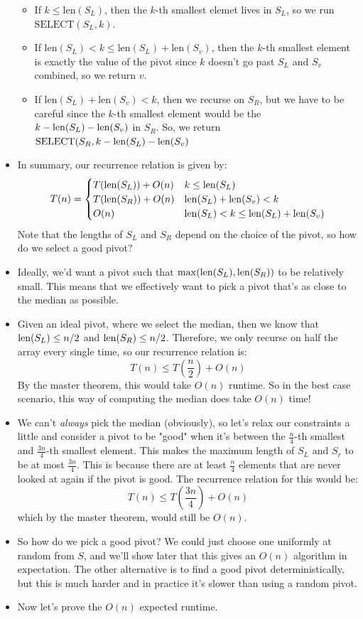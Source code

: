 \begin{itemize}
\begin{itemize}
			\item If \( k \le \text{len}(S_L) \), then the \( k \)-th smallest elemet lives in \( S_L \), so we run 
				\( \text{SELECT}(S_L, k) \).
			\item If \( \text{len}(S_L) < k \le \text{len}(S_L) + \text{len}(S_v)\), then the \( k \)-th smallest element is exactly 
				the value of the pivot since \( k \) doesn't go past \( S_L \) and \( S_v \) combined, so we return \( v \). 
			\item If \( \text{len}(S_L) + \text{len}(S_v) < k \), then we recurse on \( S_R \), but we have to be careful 
				since the \( k \)-th smallest element would be the \( k - \mathrm{len}(S_L) - \text{len}(S_v) \) in \( S_R \). So, 
				we return \( \text{SELECT}(S_R, k - \mathrm{len}(S_L) - \mathrm{len}(S_v) \)
		\end{itemize}
	\item In summary, our recurrence relation is given by:
		\[
		T(n) = \begin{cases}
			T(\mathrm{len}(S_L)) + O(n) & k \le \mathrm{len}(S_L)\\
			T(\mathrm{len}(S_R)) + O(n) & \mathrm{len}(S_L) + \mathrm{len}(S_v) < k\\
			O(n) & \mathrm{len}(S_L) < k \le \mathrm{len}(S_L) + \mathrm{len}(S_v)
		\end{cases}
		\] 
		Note that the lengths of \( S_L \) and \( S_R \) depend on the choice of the pivot, so how do we select a good pivot? 
	\item Ideally, we'd want a pivot such that \( \max(\mathrm{len}(S_L), \mathrm{len}(S_R)) \) to be relatively small. This means that 
		we effectively want to pick a pivot that's as close to the median as possible.  
	\item Given an ideal pivot, where we select the median, then we know that \( \mathrm{len}(S_L) \le  n / 2 \) and 
		\( \mathrm{len}(S_R) \le  n / 2 \). Therefore, we only recurse on half the array every single time, so our recurrence 
		relation is:
		\[
		T(n) \le  T\left( \frac{n}{2} \right) + O(n)
		\] 
		By the master theorem, this would take \( O(n) \) runtime. So in the best case scenario, this way of computing the median 
		does take \( O(n) \) time!
	\item We can't \textit{always} pick the median (obviously), so let's relax our constraints a little and consider a pivot 
		to be "good" when it's between the \( \frac{n}{4} \)-th smallest and \( \frac{3n}{4} \)-th smallest element. This 
		makes the maximum length of \( S_L \) and \( S_r \) to be at most \( \frac{3n}{4} \). This is because
		there are at least \( \frac{n}{4} \) elements that are never looked at again if the pivot is good. The recurrence 
		relation for this would be:
		\[
		T(n) \le  T\left( \frac{3n}{4} \right)  + O(n)
		\] 
		which by the master theorem, would still be \( O(n) \).  
	\item So how do we pick a good pivot? We could just choose one uniformly at random from \( S \), and we'll show later that 
		this gives an \( O(n) \) algorithm in expectation. The other alternative is to find a good pivot deterministically, but 
		this is much harder and in practice it's slower than using a random pivot. 
	\item Now let's prove the \( O(n) \) expected runtime. 
		

\end{itemize}
